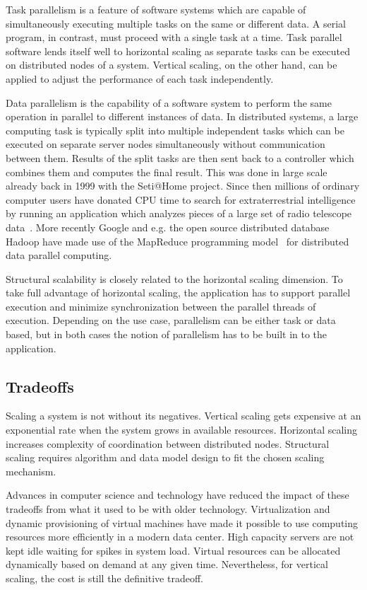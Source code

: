 \documentclass[english]{tktltiki2}
\theoremstyle{definition}
\theoremstyle{remark}
\begin{document}
Task parallelism is a feature of software systems which are capable of
simultaneously executing multiple tasks on the same or different data. A serial
program, in contrast, must proceed with a single task at a time. Task parallel
software lends itself well to horizontal scaling as separate tasks can be
executed on distributed nodes of a system. Vertical scaling, on the other hand,
can be applied to adjust the performance of each task independently.

Data parallelism is the capability of a software system to perform the same
operation in parallel to different instances of data. In distributed systems, a
large computing task is typically split into multiple independent tasks which
can be executed on separate server nodes simultaneously without communication
between them. Results of the split tasks are then sent back to a controller
which combines them and computes the final result. This was done in large
scale already back in 1999 with the Seti@Home project. Since then millions of
ordinary computer users have donated CPU time to search for extraterrestrial
intelligence by running an application which analyzes pieces of a large set of
radio telescope data~\cite{Korpela2001}\cite{setiathomewebsite}. More recently
Google and e.g. the open source distributed database Hadoop have made use of the
MapReduce programming model~\cite{handbook-mapreduce} for distributed data
parallel computing.

Structural scalability is closely related to the horizontal scaling dimension.
To take full advantage of horizontal scaling, the application has to support
parallel execution and minimize synchronization between the parallel threads of
execution. Depending on the use case, parallelism can be either task or data
based, but in both cases the notion of parallelism has to be built in to the
application.

\subsection{Tradeoffs}

Scaling a system is not without its negatives. Vertical scaling gets expensive
at an exponential rate when the system grows in available resources. Horizontal
scaling increases complexity of coordination between distributed nodes.
Structural scaling requires algorithm and data model design to fit the chosen
scaling mechanism.

Advances in computer science and technology have reduced the impact of these
tradeoffs from what it used to be with older technology. Virtualization and
dynamic provisioning of virtual machines have made it possible to use computing
resources more efficiently in a modern data center. High capacity servers are
not kept idle waiting for spikes in system load. Virtual resources can be
allocated dynamically based on demand at any given time. Nevertheless, for
vertical scaling, the cost is still the definitive tradeoff.
\end{document}

